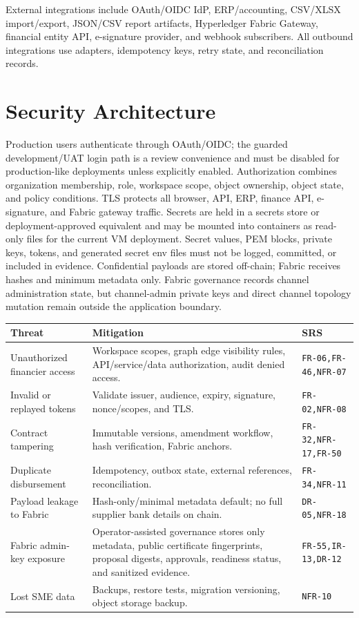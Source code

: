 \documentclass[11pt,a4paper]{article}
\newcommand{\req}[1]{\texttt{#1}}
\begin{document}
External integrations include OAuth/OIDC IdP, ERP/accounting, CSV/XLSX import/export, JSON/CSV report artifacts, Hyperledger Fabric Gateway, financial entity API, e-signature provider, and webhook subscribers. All outbound integrations use adapters, idempotency keys, retry state, and reconciliation records.

\section{Security Architecture}
Production users authenticate through OAuth/OIDC; the guarded development/UAT login path is a review convenience and must be disabled for production-like deployments unless explicitly enabled. Authorization combines organization membership, role, workspace scope, object ownership, object state, and policy conditions. TLS protects all browser, API, ERP, finance API, e-signature, and Fabric gateway traffic. Secrets are held in a secrets store or deployment-approved equivalent and may be mounted into containers as read-only files for the current VM deployment. Secret values, PEM blocks, private keys, tokens, and generated secret env files must not be logged, committed, or included in evidence. Confidential payloads are stored off-chain; Fabric receives hashes and minimum metadata only. Fabric governance records channel administration state, but channel-admin private keys and direct channel topology mutation remain outside the application boundary.

\begin{longtable}{L{42mm}L{72mm}L{32mm}}
\toprule
\textbf{Threat} & \textbf{Mitigation} & \textbf{SRS} \\
\midrule
Unauthorized financier access & Workspace scopes, graph edge visibility rules, API/service/data authorization, audit denied access. & \req{FR-06,FR-46,NFR-07} \\
Invalid or replayed tokens & Validate issuer, audience, expiry, signature, nonce/scopes, and TLS. & \req{FR-02,NFR-08} \\
Contract tampering & Immutable versions, amendment workflow, hash verification, Fabric anchors. & \req{FR-32,NFR-17,FR-50} \\
Duplicate disbursement & Idempotency, outbox state, external references, reconciliation. & \req{FR-34,NFR-11} \\
Payload leakage to Fabric & Hash-only/minimal metadata default; no full supplier bank details on chain. & \req{DR-05,NFR-18} \\
Fabric admin-key exposure & Operator-assisted governance stores only metadata, public certificate fingerprints, proposal digests, approvals, readiness status, and sanitized evidence. & \req{FR-55,IR-13,DR-12} \\
Lost SME data & Backups, restore tests, migration versioning, object storage backup. & \req{NFR-10} \\
\bottomrule
\end{longtable}
\end{document}

